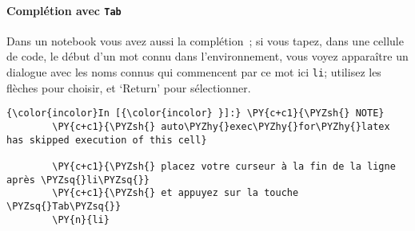     \hypertarget{compluxe9tion-avec-tab}{%
\paragraph{\texorpdfstring{Complétion avec
\texttt{Tab}}{Complétion avec Tab}}\label{compluxe9tion-avec-tab}}

    Dans un notebook vous avez aussi la complétion~; si vous tapez, dans une
cellule de code, le début d'un mot connu dans l'environnement, vous
voyez apparaître un dialogue avec les noms connus qui commencent par ce
mot ici \texttt{li}; utilisez les flèches pour choisir, et `Return' pour
sélectionner.

    \begin{Verbatim}[commandchars=\\\{\},frame=single,framerule=0.3mm,rulecolor=\color{cellframecolor}]
{\color{incolor}In [{\color{incolor} }]:} \PY{c+c1}{\PYZsh{} NOTE}
        \PY{c+c1}{\PYZsh{} auto\PYZhy{}exec\PYZhy{}for\PYZhy{}latex has skipped execution of this cell}
        
        \PY{c+c1}{\PYZsh{} placez votre curseur à la fin de la ligne après \PYZsq{}li\PYZsq{}}
        \PY{c+c1}{\PYZsh{} et appuyez sur la touche \PYZsq{}Tab\PYZsq{}}
        \PY{n}{li}
\end{Verbatim}



    
    
    
